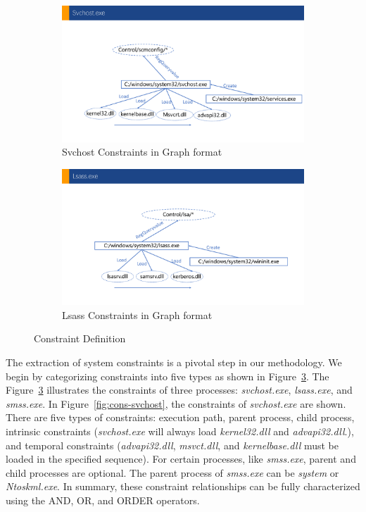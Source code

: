 \begin{figure}[h]
  \begin{subfigure}{.5\textwidth}
      \includegraphics[width=\textwidth]{figs/svchost.pdf}
      \caption{Svchost Constraints in Graph format}
      \label{fig:con-svchost-tree}
  \end{subfigure}
  \hfill
  \begin{subfigure}{.5\textwidth}
      \includegraphics[width=\textwidth]{figs/lsass.pdf}
      \caption{Lsass Constraints in Graph format}
      \label{fig:con-lsass}
  \end{subfigure}
  \caption{Constraint Definition}
  \label{fig:cons-def}
 \end{figure}


The extraction of system constraints is a pivotal step in our methodology. We begin by categorizing constraints into five types as shown in Figure~\ref{fig:cons-def}.
The Figure~\ref{fig:cons-def} illustrates the constraints of three processes: \textit{svchost.exe}, \textit{lsass.exe}, and \textit{smss.exe}. In Figure~\ref{fig:cons-svchost}, the constraints of \textit{svchost.exe} are shown. There are five types of constraints: execution path, parent process, child process, intrinsic constraints (\textit{svchost.exe} will always load \textit{kernel32.dll} and \textit{advapi32.dll}.), and temporal constraints (\textit{advapi32.dll}, \textit{msvct.dll}, and \textit{kernelbase.dll} must be loaded in the specified sequence).
For certain processes, like \textit{smss.exe}, parent and child processes are optional. The parent process of \textit{smss.exe} can be \textit{system} or \textit{Ntoskml.exe}.
In summary, these constraint relationships can be fully characterized using the AND, OR, and ORDER operators.

